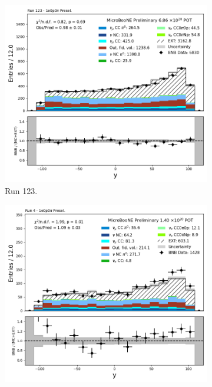 \begin{figure}[H]
    \centering
    \begin{subfigure}[t]{0.32\linewidth}
        \includegraphics[width=\linewidth]{technote/Appendix_Preselection/Figures/1e0p0pi/Run123/reco_nu_vtx_y_Run123_1e0p0pi_Presel.png}
        \caption{Run 123.}
    \end{subfigure}%
    \hspace{0.2cm}%
    \begin{subfigure}[t]{0.32\linewidth}
        \includegraphics[width=\linewidth]{technote/Appendix_Preselection/Figures/1e0p0pi/Run4b/reco_nu_vtx_y_Run4b_1e0p0pi_Presel.png}

\end{subfigure}
\end{figure}
